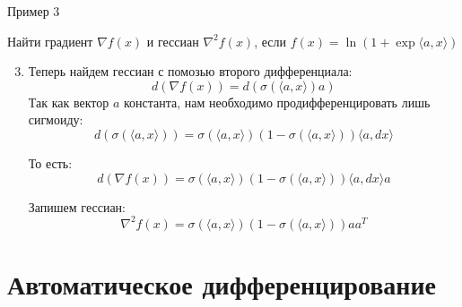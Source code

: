 \documentclass[
  9pt,
  ignorenonframetext,
  aspectratio=169,
]{beamer}
\begin{document}
\begin{frame}[noframenumbering]{Пример 3}
\label{ux43fux440ux438ux43cux435ux440-3-1}
\begin{tcolorbox}[enhanced jigsaw, bottomrule=.15mm, title=\textcolor{quarto-callout-color}{\faInfo}\hspace{0.5em}{Example}, breakable, opacitybacktitle=0.6, colbacktitle=quarto-callout-color!10!white, left=2mm, bottomtitle=1mm, colback=white, colframe=quarto-callout-color-frame, titlerule=0mm, toptitle=1mm, arc=.35mm, rightrule=.15mm, coltitle=black, toprule=.15mm, opacityback=0, leftrule=.75mm]

Найти градиент \(\nabla f(x)\) и гессиан \(\nabla^2f(x)\), если
\(f(x) = \ln \left( 1 + \exp\langle a,x\rangle\right)\)

\end{tcolorbox}

\begin{enumerate}[<+->]
\setcounter{enumi}{2}
\item
  Теперь найдем гессиан с помозью второго дифференциала: \[
   d(\nabla f(x)) = d\left( \sigma(\langle a, x\rangle) a \right)
   \] Так как вектор \(a\) константа, нам необходимо продифференцировать
  лишь сигмоиду: \[
   d\left( \sigma(\langle a, x\rangle) \right) = \sigma(\langle a, x\rangle)(1 - \sigma(\langle a, x\rangle)) \langle a, dx\rangle
   \]

  То есть: \[
   d(\nabla f(x)) = \sigma(\langle a, x\rangle)(1 - \sigma(\langle a, x\rangle)) \langle a, dx\rangle a
   \]

  Запишем гессиан: \[
   \nabla^2 f(x) = \sigma(\langle a, x\rangle)(1 - \sigma(\langle a, x\rangle)) a a^T
   \]
\end{enumerate}
\end{frame}

\section{Автоматическое
дифференцирование}\label{ux430ux432ux442ux43eux43cux430ux442ux438ux447ux435ux441ux43aux43eux435-ux434ux438ux444ux444ux435ux440ux435ux43dux446ux438ux440ux43eux432ux430ux43dux438ux435}
\end{document}
